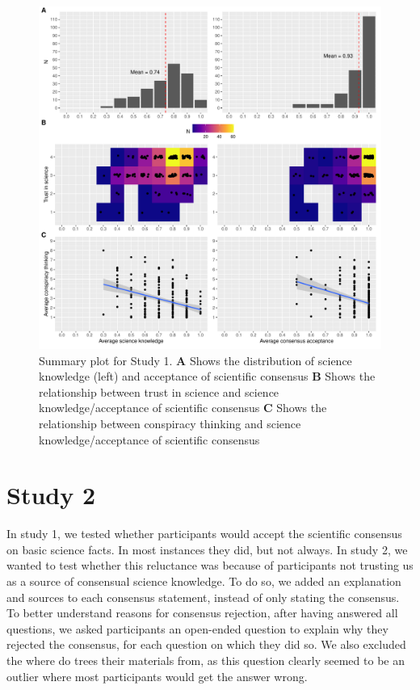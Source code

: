 \documentclass[
  doc,floatsintext]{apa6}
\begin{document}
\begin{figure}
\centering
\includegraphics{output/figures/exp1-plot-overview.pdf}
\caption{\label{fig:exp1-plot-overview}Summary plot for Study 1. \textbf{A} Shows the distribution of science knowledge (left) and acceptance of scientific consensus \textbf{B} Shows the relationship between trust in science and science knowledge/acceptance of scientific consensus \textbf{C} Shows the relationship between conspiracy thinking and science knowledge/acceptance of scientific consensus}
\end{figure}

\clearpage

\section{Study 2}\label{exp2}

In study 1, we tested whether participants would accept the scientific consensus on basic science facts. In most instances they did, but not always. In study 2, we wanted to test whether this reluctance was because of participants not trusting us as a source of consensual science knowledge. To do so, we added an explanation and sources to each consensus statement, instead of only stating the consensus. To better understand reasons for consensus rejection, after having answered all questions, we asked participants an open-ended question to explain why they rejected the consensus, for each question on which they did so. We also excluded the where do trees their materials from, as this question clearly seemed to be an outlier where most participants would get the answer wrong.
\end{document}
